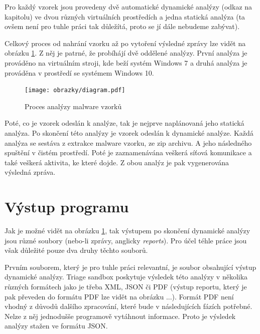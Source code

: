Pro každý vzorek jsou provedeny dvě automatické dynamické analýzy (odkaz na kapitolu) ve dvou různých virtuálních prostředích a jedna statická analýza (ta ovšem není pro tuhle práci tak důležítá, proto se jí dále nebudeme zabývat). 

Celkový proces od nahrání vzorku až po vytoření výsledné zprávy lze vidět na obrázku \ref{Analysis_diagram}. Z něj je patrné, že probíhájí dvě oddělené analýzy. První analýza je prováděno na virtuálním stroji, kde beží 
systém Windows 7 a druhá analýza je prováděna v prostředí se systémem Windows 10.

\begin{figure}[h]
	\centering
        \texttt{[image: obrazky/diagram.pdf]}
	\caption{Proces analýzy malware vzorků}
    \label{Analysis_diagram}
\end{figure}

Poté, co je vzorek odeslán k analýze, tak je nejprve naplánovaná jeho statická analýza. Po skončení této analýzy je vzorek odeslán k dynamické analýze. Každá analýza se sestáva z extrakce malware vzorku, ze zip archivu. A jeho následného spuštění v čistém prostředí. Poté je zaznamenávána veškerá síťová komunikace a také veškerá aktivita, ke které dojde.
Z obou analýz je pak vygenerována výsledná zpráva.
\section{Výstup programu}
Jak je možné vidět na obrázku \ref{Analysis_diagram}, tak výstupem po skončení dynamické analýzy jsou různé soubory (nebo-li zprávy, anglicky \textit{reports}). Pro účel téhle práce jsou však důležité pouze dva druhy těchto souborů.

Prvním souborem, který je pro tuhle práci relevantní, je soubor obsahující výstup dynamické analýzy. Triage sandbox poskytuje výsledek této analýzy v několika různých formátech jako je třeba XML, JSON či PDF (výstup reportu, který je pak převeden do formátu PDF lze vidět na obrázku ...).
Formát PDF není vhodný z důvodů dalšího zpracování, které bude v následujících fázích potřebné. Nelze z něj jednodušše programově vytáhnout informace. Proto je výsledek analýzy stažen ve formátu JSON.

